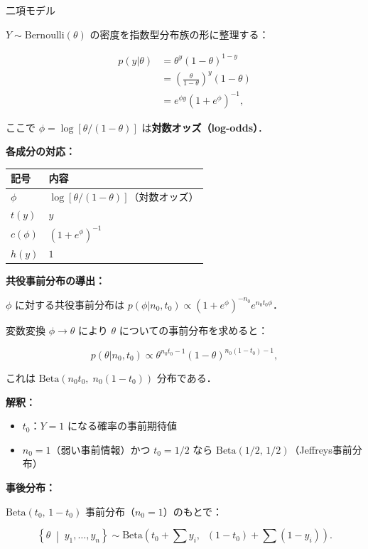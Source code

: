 \documentclass[lualatex,ja=standard,a4paper,12pt]{bxjsarticle}
\begin{document}
\begin{exbox}{二項モデル}

$Y \sim \mathrm{Bernoulli}(\theta)$ の密度を指数型分布族の形に整理する：

\begin{align*}
  p(y|\theta)
  &= \theta^y(1-\theta)^{1-y} \\
  &= \left(\frac{\theta}{1-\theta}\right)^y (1-\theta) \\
  &= e^{\phi y}(1+e^\phi)^{-1},
\end{align*}

ここで $\phi = \log[\theta/(1-\theta)]$ は\textbf{対数オッズ（log-odds）}．

\medskip
\noindent\textbf{各成分の対応：}

\medskip
\begin{center}
\begin{tabular}{ll}
\toprule
記号 & 内容 \\
\midrule
$\phi$ & $\log[\theta/(1-\theta)]$（対数オッズ） \\
$t(y)$ & $y$ \\
$c(\phi)$ & $(1+e^\phi)^{-1}$ \\
$h(y)$ & $1$ \\
\bottomrule
\end{tabular}
\end{center}

\medskip
\noindent\textbf{共役事前分布の導出：}

$\phi$ に対する共役事前分布は
$p(\phi|n_0, t_0) \propto (1+e^\phi)^{-n_0} e^{n_0 t_0 \phi}$．

変数変換 $\phi \to \theta$ により $\theta$ についての事前分布を求めると：

\[
  p(\theta|n_0, t_0) \propto \theta^{n_0 t_0 - 1}(1-\theta)^{n_0(1-t_0)-1},
\]

これは $\mathrm{Beta}(n_0 t_0,\; n_0(1-t_0))$ 分布である．

\medskip
\noindent\textbf{解釈：}
\begin{itemize}
  \item $t_0$：$Y=1$ になる確率の事前期待値
  \item $n_0 = 1$（弱い事前情報）かつ $t_0 = 1/2$ なら
        $\mathrm{Beta}(1/2,\, 1/2)$（Jeffreys事前分布）
\end{itemize}

\medskip
\noindent\textbf{事後分布：}

$\mathrm{Beta}(t_0,\, 1-t_0)$ 事前分布（$n_0=1$）のもとで：

\[
  \left\{\theta\;\middle|\; y_1,\ldots,y_n\right\}
  \sim \mathrm{Beta}\!\left(t_0 + \sum y_i,\;\; (1-t_0) + \sum(1-y_i)\right).
\]

\end{exbox}
\end{document}
